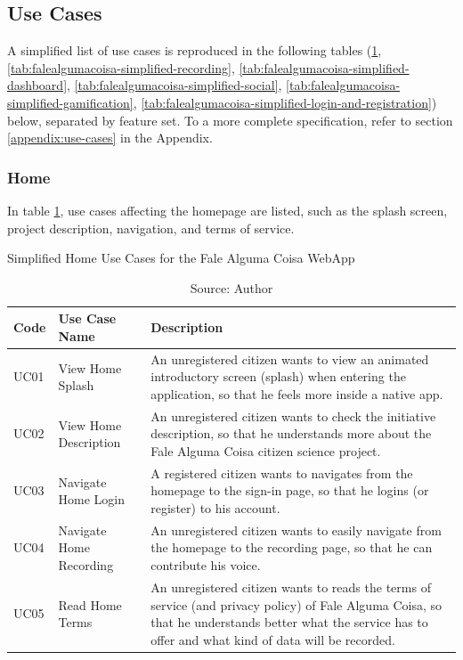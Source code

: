 \clearpage
\subsection{Use Cases}
\label{sec:simplified-use-cases}

A simplified list of use cases is reproduced in the following tables (\ref{tab:falealgumacoisa-simplified-home}, \ref{tab:falealgumacoisa-simplified-recording}, \ref{tab:falealgumacoisa-simplified-dashboard}, \ref{tab:falealgumacoisa-simplified-social}, \ref{tab:falealgumacoisa-simplified-gamification}, \ref{tab:falealgumacoisa-simplified-login-and-registration}) below, separated by feature set. To a more complete specification, refer to section \ref{appendix:use-cases} in the Appendix.

\subsubsection{Home}

In table \ref{tab:falealgumacoisa-simplified-home}, use cases affecting the homepage are listed, such as the splash screen, project description, navigation, and terms of service.

\begin{table}[h]
\caption{Simplified Home Use Cases for the Fale Alguma Coisa WebApp}
\label{tab:falealgumacoisa-simplified-home}
\centering
\begin{tabular}{|p{1cm}|p{3cm}|p{10cm}|}
\hline
    Code & Use Case Name & Description \\ \hline
    UC01 & View Home Splash & An unregistered citizen wants to view an animated introductory screen (splash) when entering the application, so that he feels more inside a native app. \\ \hline
    UC02 & View Home Description & An unregistered citizen wants to check the initiative description, so that he understands more about the Fale Alguma Coisa citizen science project. \\ \hline
    UC03 & Navigate Home Login & A registered citizen wants to navigates from the homepage to the sign-in page, so that he logins (or register) to his account. \\ \hline
    UC04 & Navigate Home Recording & An unregistered citizen wants to easily navigate from the homepage to the recording page, so that he can contribute his voice. \\ \hline
    UC05 & Read Home Terms & An unregistered citizen wants to reads the terms of service (and privacy policy) of Fale Alguma Coisa, so that he understands better what the service has to offer and what kind of data will be recorded. \\ \hline
\end{tabular}
\caption*{Source: Author}
\end{table}

